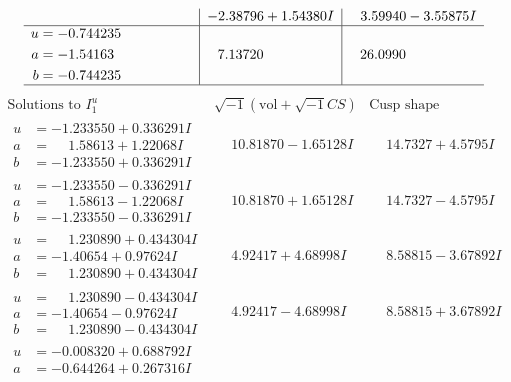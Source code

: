 \documentclass[1p]{elsarticle_modified}
\theoremstyle{definition}
\newcommand{\I}{\sqrt{-1}}
\begin{document}
$$\begin{array}{c|c|c}
 & -2.38796 + 1.54380 I & \phantom{-}3.59940 - 3.55875 I \\ \hline\begin{aligned}
u &= -0.744235\phantom{ +0.000000I} \\
a &= -1.54163\phantom{ +0.000000I} \\
b &= -0.744235\phantom{ +0.000000I}\end{aligned}
 & \phantom{-}7.13720\phantom{ +0.000000I} & \phantom{-}26.0990\phantom{ +0.000000I}\\
 \hline 
 \end{array}$$\newpage$$\begin{array}{c|c|c}  
\text{Solutions to }I^u_{1}& \I (\text{vol} + \sqrt{-1}CS) & \text{Cusp shape}\\
 \hline 
\begin{aligned}
u &= -1.233550 + 0.336291 I \\
a &= \phantom{-}1.58613 + 1.22068 I \\
b &= -1.233550 + 0.336291 I\end{aligned}
 & \phantom{-}10.81870 - 1.65128 I & \phantom{-}14.7327 + 4.5795 I \\ \hline\begin{aligned}
u &= -1.233550 - 0.336291 I \\
a &= \phantom{-}1.58613 - 1.22068 I \\
b &= -1.233550 - 0.336291 I\end{aligned}
 & \phantom{-}10.81870 + 1.65128 I & \phantom{-}14.7327 - 4.5795 I \\ \hline\begin{aligned}
u &= \phantom{-}1.230890 + 0.434304 I \\
a &= -1.40654 + 0.97624 I \\
b &= \phantom{-}1.230890 + 0.434304 I\end{aligned}
 & \phantom{-}4.92417 + 4.68998 I & \phantom{-}8.58815 - 3.67892 I \\ \hline\begin{aligned}
u &= \phantom{-}1.230890 - 0.434304 I \\
a &= -1.40654 - 0.97624 I \\
b &= \phantom{-}1.230890 - 0.434304 I\end{aligned}
 & \phantom{-}4.92417 - 4.68998 I & \phantom{-}8.58815 + 3.67892 I \\ \hline\begin{aligned}
u &= -0.008320 + 0.688792 I \\
a &= -0.644264 + 0.267316 I \\

\end{aligned}
\end{array}$$
\end{document}
